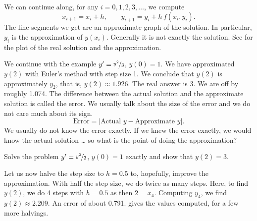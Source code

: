 \begin{myfig}
\capstart
\caption{First two steps of Euler's method with $h=1$ for
the equation $y' = \frac{y^2}{3}$ with initial conditions $y(0)=1$.%
\label{euler-step12:fig}}
\end{myfig}

We can continue along, for any $i=0,1,2,3,\ldots$, we compute
\begin{equation*}
x_{i+1} = x_i + h , \qquad y_{i+1}  = y_i + h\, f(x_i,y_i) .
\end{equation*}
The line segments we get are an
approximate graph of the solution.
In particular, $y_i$ is the approximation of $y(x_i)$.
Generally it is not exactly the solution.
See
 for the plot of the real solution
and the approximation.

\begin{myfig}
\capstart
{}
\caption{Two steps of Euler's method (step size 1) and the exact solution for
the equation $y' = \frac{y^2}{3}$ with initial conditions $y(0)=1$.
%
\label{euler-step12-sol:fig}}
\end{myfig}

We continue with the example $y' = \nicefrac{y^2}{3}$, $y(0)=1$.
We have approximated $y(2)$ with Euler's method with step size 1.
We conclude that $y(2)$ is approximately $y_2$, that is,
$y(2) \approx 1.926$.
The real answer is 3.
We are off by roughly 1.074.
The difference between the actual solution and the approximate solution is
called the error.  We usually talk about the size of the error
and we do not care much about its sign.
\begin{equation*}
\text{Error} = \bigl\lvert \text{Actual } y - \text{Approximate } y
\bigr\rvert .
\end{equation*}
We usually do not know the error exactly.
If we knew the error exactly, we would know the actual solution \ldots
so what is the point of doing the approximation?

\begin{exercise}
Solve the problem
$y' = \nicefrac{y^2}{3}$, $y(0)=1$
exactly and show that $y(2) = 3$.
\end{exercise}

Let us now halve the step size to $h=0.5$ to, hopefully, improve the approximation.
With half the step size, we do twice as many steps.
Here, to find $y(2)$, we do 4 steps with $h=0.5$ as then $2 = x_4$.
Computing $y_4$,
we find $y(2) \approx 2.209$.  An error of about 0.791.
 gives the values computed,
for a few more halvings.

